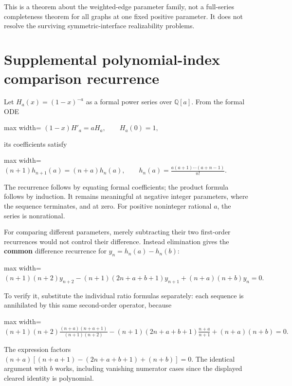 \documentclass[
  11pt,
  a4paper,
]{report}
\begin{document}
This is a theorem about the weighted-edge parameter family, not a
full-series completeness theorem for all graphs at one fixed positive
parameter. It does not resolve the surviving symmetric-interface
realizability problems.

\hypertarget{supplemental-polynomial-index-comparison-recurrence}{%
\section{Supplemental polynomial-index comparison
recurrence}\label{supplemental-polynomial-index-comparison-recurrence}}

Let \(H_a(x)=(1-x)^{-a}\) as a formal power series over
\(\mathbb Q[a]\). From the formal ODE \begin{center}
\begin{adjustbox}{max width=\linewidth}
$\displaystyle
 (1-x)H'_a=aH_a,\qquad H_a(0)=1,
$
\end{adjustbox}
\end{center} its coefficients satisfy \begin{center}
\begin{adjustbox}{max width=\linewidth}
$\displaystyle
 (n+1)h_{n+1}(a)=(n+a)h_n(a),\qquad
 h_n(a)=\frac{a(a+1)\cdots(a+n-1)}{n!}.
$
\end{adjustbox}
\end{center} The recurrence follows by equating formal coefficients; the product
formula follows by induction. It remains meaningful at negative integer
parameters, where the sequence terminates, and at zero. For positive
noninteger rational \(a\), the series is nonrational.

For comparing different parameters, merely subtracting their two
first-order recurrences would not control their difference. Instead
elimination gives the \textbf{common} difference recurrence for
\(y_n=h_n(a)-h_n(b)\): \begin{center}
\begin{adjustbox}{max width=\linewidth}
$\displaystyle
 (n+1)(n+2)y_{n+2}
 -(n+1)(2n+a+b+1)y_{n+1}
 +(n+a)(n+b)y_n=0.
$
\end{adjustbox}
\end{center} To verify it, substitute the individual ratio formulas separately:
each sequence is annihilated by this same second-order operator, because
\begin{center}
\begin{adjustbox}{max width=\linewidth}
$\displaystyle
 (n+1)(n+2)\frac{(n+a)(n+a+1)}{(n+1)(n+2)}
 -(n+1)(2n+a+b+1)\frac{n+a}{n+1}
 +(n+a)(n+b)=0.
$
\end{adjustbox}
\end{center} The expression factors \((n+a)[(n+a+1)-(2n+a+b+1)+(n+b)]=0\). The
identical argument with \(b\) works, including vanishing numerator cases
since the displayed cleared identity is polynomial.
\end{document}
